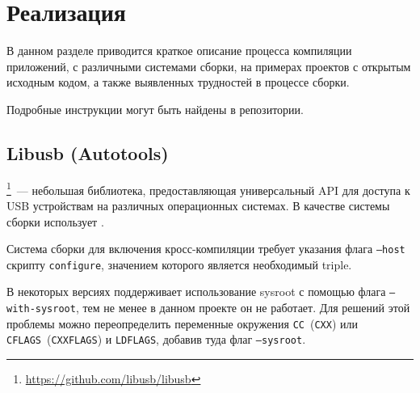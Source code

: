 
\section{Реализация}

В данном разделе приводится краткое описание процесса компиляции приложений, с различными системами сборки, на примерах проектов с открытым исходным кодом, а также выявленных трудностей в процессе сборки.

Подробные инструкции могут быть найдены в репозитории.


\subsection{Libusb (Autotools)}

\libusb{}\footnote{\url{https://github.com/libusb/libusb}}~--- небольшая библиотека, предоставляющая универсальный API для доступа к USB устройствам на различных операционных системах.
В качестве системы сборки использует \autotools{}.

Система сборки \autotools{} для включения кросс-компиляции требует указания флага \texttt{--host} скрипту \texttt{configure}, значением которого является необходимый triple.

В некоторых версиях \autotools{} поддерживает использование sysroot с помощью флага \texttt{--with-sysroot}, тем не менее в данном проекте он не работает.
Для решений этой проблемы можно переопределить переменные окружения \texttt{CC}~(\texttt{CXX}) или \texttt{CFLAGS}~(\texttt{CXXFLAGS}) и \texttt{LDFLAGS}, добавив туда флаг \texttt{--sysroot}.



